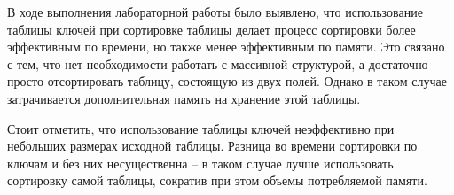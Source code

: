 \Conclusion

В ходе выполнения лабораторной работы было выявлено, что использование таблицы ключей при сортировке таблицы делает процесс сортировки более эффективным по времени, но также менее эффективным по памяти. Это связано с тем, что нет необходимости работать с массивной структурой, а достаточно просто отсортировать таблицу, состоящую из двух полей. Однако в таком случае затрачивается дополнительная память на хранение этой таблицы.

Стоит отметить, что использование таблицы ключей неэффективно при небольших размерах исходной таблицы. Разница во времени сортировки по ключам и без них несущественна -- в таком случае лучше использовать сортировку самой таблицы, сократив при этом объемы потребляемой памяти.